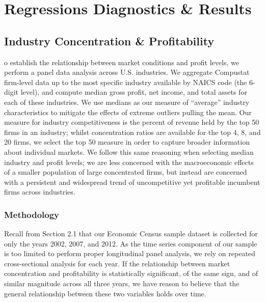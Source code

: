 %
%
\let\textcircled=\pgftextcircled
\chapter{Regressions Diagnostics \& Results}
\label{chap:3}


\section{Industry Concentration \& Profitability}
\label{sec:sec05}

o establish the relationship between market conditions and profit levels, we perform a panel data analysis across U.S. industries. We aggregate Compustat firm-level data up to the most specific industry available by NAICS code (the 6-digit level), and compute median gross profit, net income, and total assets for each of these industries. We use medians as our measure of “average” industry characteristics to mitigate the effects of extreme outliers pulling the mean. Our measure for industry competitiveness is the percent of revenue held by the top 50 firms in an industry; whilst concentration ratios are available for the top 4, 8, and 20 firms, we select the top 50 measure in order to capture broader information about individual markets. We follow this same reasoning when selecting median industry and profit levels; we are less concerned with the macroeconomic effects of a smaller population of large concentrated firms, but instead are concerned with a persistent and widespread trend of uncompetitive yet profitable incumbent firms across industries.


\subsection{Methodology}

Recall from Section 2.1 that our Economic Census sample dataset is collected for only the years 2002, 2007, and 2012. As the time series component of our sample is too limited to perform proper longitudinal panel analysis, we rely on repeated cross-sectional analysis for each year. If the relationship between market concentration and profitability is statistically significant, of the same sign, and of similar magnitude across all three years, we have reason to believe that the general relationship between these two variables holds over time.


